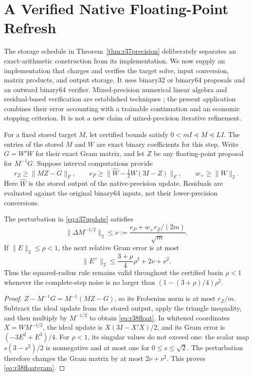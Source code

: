 \section{A Verified Native Floating-Point Refresh}
\label{sec:r38native}
The storage schedule in Theorem~\ref{thm:r37precision} deliberately separates
an exact-arithmetic construction from its implementation. We now supply an
implementation that charges and verifies the target solve, input conversion,
matrix products, and output storage. It uses binary32 or binary64 proposals
and an outward binary64 verifier. Mixed-precision numerical linear algebra
and residual-based verification are established techniques
\citep{r38carson2018,r38rump2010}; the present application combines their
error accounting with a trainable continuation and an economic stopping
criterion. It is not a new claim of mixed-precision iterative refinement.

For a fixed stored target $M$, let certified bounds satisfy
$0<mI\preceq M\preceq LI$. The entries of the stored $M$ and $W$ are exact
binary coefficients for this step. Write $G=W'W$ for their exact Gram
matrix, and let $Z$ be any floating-point proposal for $M^{-1}G$.
Suppose interval computations provide
\[
 r_Z\geq\|MZ-G\|_F,\qquad
 e_P\geq\|\widehat W-\tfrac12W(3I-Z)\|_F,\qquad
 w_+\geq\|W\|_2.
\]
Here $\widehat W$ is the stored output of the native-precision update.
Residuals are evaluated against the original binary64 inputs, not their
lower-precision conversions.

\begin{proposition}
\label{prop:r38float}
The perturbation in \eqref{eq:r37update} satisfies
\begin{equation}\label{eq:r38float}
 \|\Delta M^{-1/2}\|_2\leq
 \nu:=\frac{e_P+w_+r_Z/(2m)}{\sqrt m}.
\end{equation}
If $\|E\|_2\leq\rho<1$, the next relative Gram error is at most
\begin{equation}\label{eq:r38floatgram}
 \|E^+\|_2\leq\frac{3+\rho}{4}\rho^2+2\nu+\nu^2.
\end{equation}
Thus the squared-radius rule remains valid throughout the certified basin
$\rho<1$ whenever the complete-step noise is no larger than
$(1-(3+\rho)/4)\rho^2$.
\end{proposition}

\begin{proof}
$Z-M^{-1}G=M^{-1}(MZ-G)$, so its Frobenius norm is at most $r_Z/m$.
Subtract the ideal update from the stored output, apply the triangle
inequality, and then multiply by $M^{-1/2}$ to obtain
\eqref{eq:r38float}. In whitened coordinates $X=WM^{-1/2}$, the ideal
update is $X(3I-X'X)/2$, and its Gram error is
$(-3E^2+E^3)/4$. For $\rho<1$, its singular values do not exceed one:
the scalar map $s(3-s^2)/2$ is nonnegative and at most one for
$0\leq s\leq\sqrt2$. The perturbation therefore changes the Gram matrix
by at most $2\nu+\nu^2$. This proves \eqref{eq:r38floatgram}.
\end{proof}


